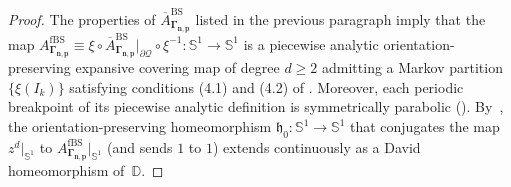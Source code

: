 \documentclass[JEP,XML,SOM,Unicode,NoFloatCountersInSection,published]{cedram}
\theoremstyle{definition}
\theoremstyle{remark}
\newcommand{\D}{\mathbb{D}}
\begin{document}
\begin{proof}
The properties of $\overline{A}_{\pmb{\Gamma_{n,p}}}^{\mathrm{BS}}$ listed in the previous paragraph imply that the map $A_{\pmb{\Gamma_{n,p}}}^{\mathrm{fBS}}\equiv \xi\circ \overline{A}_{\pmb{\Gamma_{n,p}}}^{\mathrm{BS}}\vert_{\partial\mathcal{Q}}\circ\xi^{-1}:\mathbb{S}^1\to\mathbb{S}^1$ is a piecewise analytic orientation-preserving expansive covering map of degree $d\geq2$ admitting a Markov partition $\{\xi(I_k)\}$ satisfying conditions (4.1) and (4.2) of \cite[Th.\,4.12]{LMMN}. Moreover, each periodic breakpoint of its piecewise analytic definition is symmetrically parabolic (\cf \cite[Def.\,4.6, Rem.\,4.7]{LMMN}). By~\cite[Th.\,4.12]{LMMN}, the orientation-preserving homeomorphism $\mathfrak{h}_0:\mathbb{S}^1\to\mathbb{S}^1$ that conjugates the map $z^d\vert_{\mathbb{S}^1}$ to $A_{\pmb{\Gamma_{n,p}}}^{\mathrm{fBS}}\vert_{\mathbb{S}^1}$ (and sends $1$ to $1$) extends continuously as a David homeomorphism of~$\D$.
\end{proof}
\end{document}
